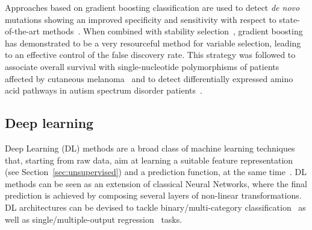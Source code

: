 	    Approaches based on gradient boosting classification are used to detect \textit{de novo} mutations showing an improved specificity and sensitivity with respect to state-of-the-art methods~\citep{liu2014gradient}.
	    When combined with stability selection~\citep{meinshausen2010stability}, gradient boosting has demonstrated to be a very resourceful method for variable selection, leading to an effective control of the false discovery rate. This strategy was followed to associate overall survival with single-nucleotide polymorphisms of patients affected by cutaneous melanoma~\citep{he2016component} and to detect differentially expressed amino acid pathways in autism spectrum disorder patients~\citep{hofner2015controlling}.







	    \subsection{Deep learning}
	    Deep Learning (DL) methods are a broad class of machine learning techniques that, starting from raw data, aim at learning a suitable feature representation (see Section~\ref{sec:unsupervised}) and a prediction function, at the same time~\cite{lecun2015deep}. DL methods can be seen as an extension of classical Neural Networks, where the final prediction is achieved by composing several layers of non-linear transformations.
	    DL architectures can be devised to tackle binary/multi-category classification~\cite{angermueller2016deep, leung2014deep} as well as single/multiple-output regression~\cite{Chen2016GeneEI, ma2015deep} tasks.

